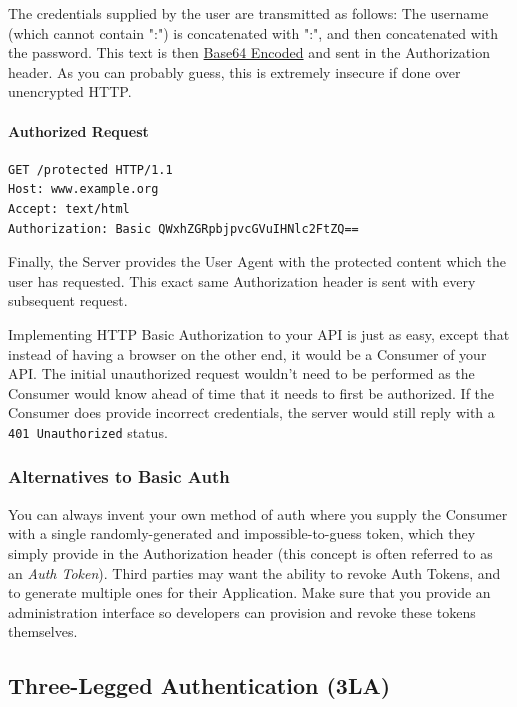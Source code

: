\documentclass{book}
\begin{document}
The credentials supplied by the user are transmitted as follows: The username (which cannot contain ":") is concatenated with ":", and then concatenated with the password. This text is then \href{https://en.wikipedia.org/wiki/Base64}{Base64 Encoded} and sent in the Authorization header. As you can probably guess, this is extremely insecure if done over unencrypted HTTP.

\paragraph{\textbf{Authorized Request}}

\begin{verbatim}
GET /protected HTTP/1.1
Host: www.example.org
Accept: text/html
Authorization: Basic QWxhZGRpbjpvcGVuIHNlc2FtZQ==
\end{verbatim}

Finally, the Server provides the User Agent with the protected content which the user has requested. This exact same Authorization header is sent with every subsequent request.

Implementing HTTP Basic Authorization to your API is just as easy, except that instead of having a browser on the other end, it would be a Consumer of your API. The initial unauthorized request wouldn't need to be performed as the Consumer would know ahead of time that it needs to first be authorized. If the Consumer does provide incorrect credentials, the server would still reply with a \texttt{401 Unauthorized} status.

\subsubsection{Alternatives to Basic Auth}

You can always invent your own method of auth where you supply the Consumer with a single randomly-generated and impossible-to-guess token, which they simply provide in the Authorization header (this concept is often referred to as an \emph{Auth Token}). Third parties may want the ability to revoke Auth Tokens, and to generate multiple ones for their Application. Make sure that you provide an administration interface so developers can provision and revoke these tokens themselves.

\subsection{Three-Legged Authentication (3LA)}
\end{document}

